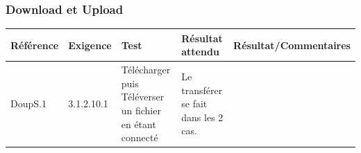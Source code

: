\documentclass[10pt,a4paper,landscape]{report}
\begin{document}
\subsubsection{Download et Upload}
\begin{center}
	\bgroup
	\def\arraystretch{1.5}
	\begin{tabular}{|p{1.5cm}|p{2cm}|p{8.5cm}|p{8.5cm}|p{5cm}|}
		\hline
		\rowcolor{gris}Référence & Exigence & Test & Résultat attendu & Résultat/Commentaires\\
		\hline
		DoupS.1 & 3.1.2.10.1 & Télécharger puis Téléverser un fichier en étant connecté & Le transférer se fait dans les 2 cas. & \\
		\hline
	\end{tabular}
	\egroup
\end{center}
\end{document}
